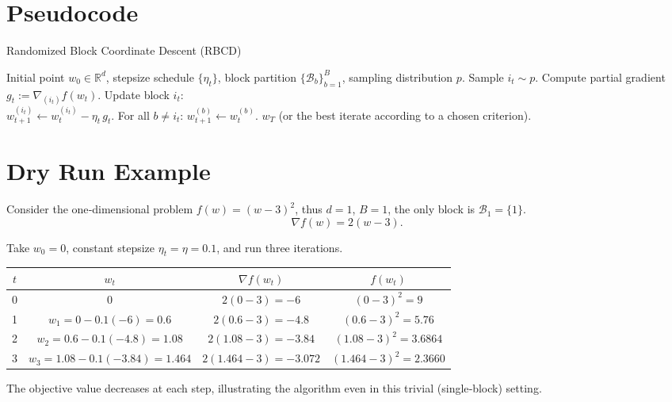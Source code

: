 \documentclass{article}
\newcommand{\R}{\mathbb{R}}
\begin{document}
\section*{Pseudocode}
\begin{algorithm}[H]
\caption{Randomized Block Coordinate Descent (RBCD)}
\begin{algorithmic}[1]
\REQUIRE Initial point $w_0\in\R^{d}$, stepsize schedule $\{\eta_t\}$,
         block partition $\{\mathcal{B}_b\}_{b=1}^{B}$,
         sampling distribution $p$.
    \STATE Sample $i_t\sim p$.
    \STATE Compute partial gradient $\displaystyle g_t:=\nabla_{(i_t)}f(w_t)$.
    \STATE Update block $i_t$: \\
    \hspace{1.2cm}$w_{t+1}^{(i_t)} \gets w_{t}^{(i_t)} - \eta_t\, g_t$.
    \STATE For all $b\neq i_t$: $w_{t+1}^{(b)}\gets w_{t}^{(b)}$.
\ENDFOR
\RETURN $w_T$ (or the best iterate according to a chosen criterion).
\end{algorithmic}
\end{algorithm}

\section*{Dry Run Example}
Consider the one‑dimensional problem $f(w)=(w-3)^2$, thus $d=1$, $B=1$,
the only block is $\mathcal{B}_1=\{1\}$.
\[
\nabla f(w)=2(w-3).
\]

Take $w_0=0$, constant stepsize $\eta_t=\eta=0.1$, and run three iterations.

\begin{center}
\begin{tabular}{c|c|c|c}
$t$ & $w_t$ & $\nabla f(w_t)$ & $f(w_t)$\\ \hline
0 & $0$ & $2(0-3)=-6$ & $(0-3)^2=9$\\
1 & $w_1=0-0.1(-6)=0.6$ & $2(0.6-3)=-4.8$ & $(0.6-3)^2=5.76$\\
2 & $w_2=0.6-0.1(-4.8)=1.08$ & $2(1.08-3)=-3.84$ & $(1.08-3)^2=3.6864$\\
3 & $w_3=1.08-0.1(-3.84)=1.464$ & $2(1.464-3)=-3.072$ & $(1.464-3)^2=2.3660$
\end{tabular}
\end{center}
The objective value decreases at each step, illustrating the algorithm
even in this trivial (single‑block) setting.

\end{document}
